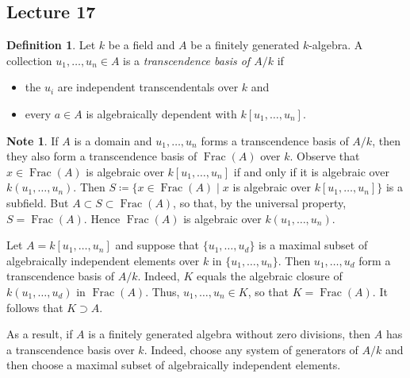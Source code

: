 \documentclass[10pt,letterpaper,cm]{nupset}
\theoremstyle{definition}
\newtheorem*{definition}{Definition}
\newtheorem{note}{Note}
\newcommand{\1}{\mathbf{1}}
\newcommand{\0}{\vec 0}
\DeclareMathOperator{\Frac}{Frac}
\begin{document}
\subsection{Lecture 17}

\begin{definition}
Let $k$ be a field and $A$ be a finitely generated $k$-algebra. A collection $u_1, \ldots, u_n \in A$ is a \textit{transcendence basis of $A/k$} if 
\begin{itemize}
\item the $u_i$ are independent transcendentals over $k$ and
\item every $a\in A$ is algebraically dependent with $k[u_1, \ldots, u_n]$. 
\end{itemize}
\end{definition}

\begin{note}
If $A$ is a domain and $u_1, \ldots, u_n$ forms a transcendence basis of $A/k$, then they also form a transcendence basis of $\Frac(A)$ over $k$. Observe that $x\in \Frac(A)$ is algebraic over $k[u_1, \ldots, u_n]$ if and only if it is algebraic over $k(u_1, \ldots, u_n)$. Then $S\coloneqq  \{x\in \Frac(A) \mid x$ is algebraic over $k[u_1, \ldots, u_n]\}$ is a subfield. But $A \subset S \subset \Frac(A)$, so that, by the universal property, $S= \Frac(A)$. Hence $\Frac(A)$ is algebraic over $k(u_1, \ldots, u_n)$. 

Let $A = k[u_1, \ldots, u_n]$ and suppose that $\{u_1, \ldots, u_d\}$ is a maximal subset of algebraically independent elements over $k$ in $\{u_1, \ldots, u_n\}$. Then $u_1, \ldots, u_d$ form a transcendence basis of $A/k$. Indeed, $K$ equals the algebraic closure of $k(u_1, \ldots, u_d)$ in $\Frac(A)$. Thus, $u_1, \ldots, u_n \in K$, so that $K = \Frac(A)$. It follows that $K \supset A$. 

As a result, if $A$ is a finitely generated algebra without zero divisions, then $A$ has a transcendence basis over $k$. Indeed, choose any system of generators of $A/k$ and then choose a maximal subset of algebraically independent elements. 
\end{note}
\end{document}
